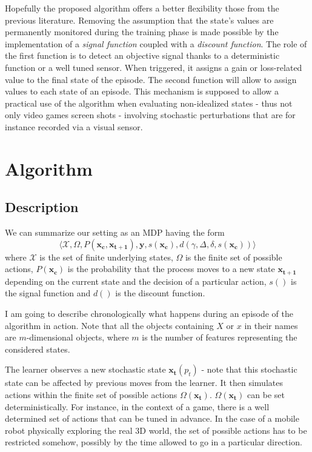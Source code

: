 \documentclass[scrartcl, 10.5 pt, conference]{ieeeconf}
\newcommand{\B}[1]{\mathbf{#1}}
\begin{document}
Hopefully the proposed algorithm offers a better flexibility those from the previous literature. Removing the assumption that the state's values are permanently monitored during the training phase is made possible by the implementation of a \textit{signal function} coupled with a \textit{discount function}. The role of the first function is to detect an objective signal thanks to a deterministic function or a well tuned sensor. When triggered, it assigns a gain or loss-related value to the final state of the episode. The second function will allow to assign values to each state of an episode. This mechanism is supposed to allow a practical use of the algorithm when evaluating non-idealized states - thus not only video games screen shots - involving stochastic perturbations that are for instance recorded via a visual sensor. 

\section{Algorithm}

\subsection{Description}

We can summarize our setting as an MDP having the form
$$\langle \mathcal{X},\Omega, P(\B{x_c},\B{x_{t+1}}), \B{y},s(\B{x_c}),d(\gamma, \Delta, \delta, s(\B{x_c})) \rangle$$
where $\mathcal{X}$ is the set of finite underlying states, $\Omega$ is the finite set of possible actions, $P(\B{x_c})$ is the probability that the process moves to a new state $\B{x_{t+1}}$ depending on the current state and the decision of a particular action, $s()$ is the signal function and $d()$ is the discount function.

I am going to describe chronologically what happens during an episode of the algorithm in action. Note that all the objects containing $X$ or $x$ in their names are $m$-dimensional objects, where $m$ is the number of features representing the considered states.

The learner observes a new stochastic state $\B{x_t}(p_t)$ - note that this stochastic state can be affected by previous moves from the learner. It then simulates actions within the finite set of possible actions $\Omega(\B{x_t})$. $\Omega(\B{x_t})$ can be set deterministically. For instance, in the context of a game, there is a well determined set of actions that can be tuned in advance. In the case of a mobile robot physically exploring the real 3D world, the set of possible actions has to be restricted somehow, possibly by the time allowed to go in a particular direction.
\end{document}
